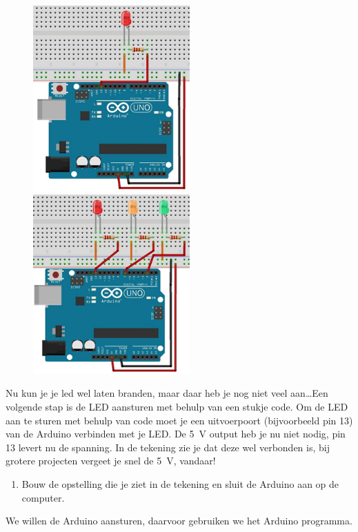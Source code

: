 \documentclass{arduino}
\begin{document}
\begin{figure}
\raggedleft
\includegraphics[width=6cm]{9. Circuit blinking LED}

\includegraphics[width=6cm]{11. Circuit traffic light}
\end{figure}

Nu kun je je led wel laten branden, maar daar heb je nog niet veel aan\dots Een volgende stap is de LED aansturen met behulp van een stukje code. Om de LED aan te sturen met behulp van code moet je een uitvoerpoort (bijvoorbeeld pin 13) van de Arduino verbinden met je LED. De \SI{5}{\volt} output heb je nu niet nodig, pin 13 levert nu de spanning. In de tekening zie je dat deze wel verbonden is, bij grotere projecten vergeet je snel de \SI{5}{\volt}, vandaar!

\begin{enumerate}[label={\alph*})]
\item Bouw de opstelling die je ziet in de tekening en sluit de Arduino aan op de computer.
\end{enumerate}

We willen de Arduino aansturen, daarvoor gebruiken we het Arduino programma.
\end{document}
